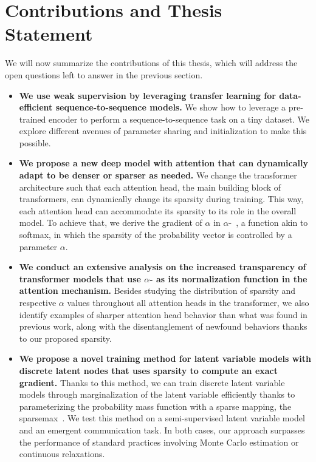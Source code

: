\section{Contributions and Thesis Statement}
\label{sec:int_contributions}

\noindent We will now summarize the contributions of this thesis, which will
address the open questions left to answer in the previous section.

\begin{itemize}

      \item \textbf{We use weak supervision by leveraging transfer learning
                  for data-efficient sequence-to-sequence models.} We show how to
            leverage a pre-trained encoder to perform a
            sequence-to-sequence task on a tiny dataset. We explore different
            avenues of parameter sharing and initialization to make this
            possible.


      \item \textbf{We propose a new deep model with attention that can
                  dynamically adapt to be denser or sparser as needed.} We change the
            transformer architecture such that each attention head, the main
            building block of transformers, can dynamically change its sparsity
            during training. This way, each attention head can accommodate its
            sparsity to its role in the overall model. To achieve that, we derive
            the gradient of $\alpha$ in $\alpha$-\entmaxtext{}~\citep{entmax}, a
            function akin to softmax, in which the sparsity of the probability
            vector is controlled by a parameter $\alpha$.

      \item \textbf{We conduct an extensive analysis on the increased
                  transparency of transformer models that use {\boldmath
                              $\alpha$}-\entmaxtext{} as its normalization function in the
                  attention mechanism.}
            Besides studying the distribution of sparsity and respective $\alpha$ values
            throughout all attention heads in the transformer, we also identify
            examples of sharper attention head behavior than what was found in
            previous work, along with the disentanglement of newfound behaviors
            thanks to our proposed sparsity.

      \item \textbf{We propose a novel training method for latent variable
                  models with discrete latent nodes that uses sparsity to compute an
                  exact gradient.} Thanks to this method, we can train discrete latent
            variable models through marginalization of the latent variable
            efficiently thanks to parameterizing the probability mass function
            with a sparse mapping, the sparsemax~\citep{sparsemax}. We test this
            method on a semi-supervised latent variable model and an emergent
            communication task. In both cases, our approach surpasses the
            performance of standard practices involving Monte Carlo estimation or
            continuous relaxations.


\end{itemize}
